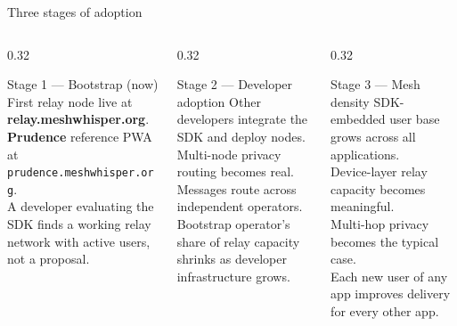 \documentclass[aspectratio=169, 11pt]{beamer}
\begin{document}
\begin{frame}{Three stages of adoption}
\vspace{3mm}
\begin{columns}[T]
  \begin{column}{0.32\textwidth}
    \begin{block}{Stage 1 — Bootstrap \textcolor{mwgreen}{(now)}}
      \small First relay node live at \textbf{relay.meshwhisper.org}.\\[4pt]
      \textbf{Prudence} reference PWA at \texttt{prudence.meshwhisper.org}.\\[4pt]
      A developer evaluating the SDK finds a working relay network with active users, not a proposal.
    \end{block}
  \end{column}
  \begin{column}{0.32\textwidth}
    \begin{block}{Stage 2 — Developer adoption}
      \small Other developers integrate the SDK and deploy nodes.\\[4pt]
      Multi-node privacy routing becomes real.\\
      Messages route across independent operators.\\[4pt]
      Bootstrap operator's share of relay capacity shrinks as developer infrastructure grows.
    \end{block}
  \end{column}
  \begin{column}{0.32\textwidth}
    \begin{block}{Stage 3 — Mesh density}
      \small SDK-embedded user base grows across all applications.\\[4pt]
      Device-layer relay capacity becomes meaningful.\\
      Multi-hop privacy becomes the typical case.\\[4pt]
      Each new user of any app improves delivery for every other app.
    \end{block}
  \end{column}
\end{columns}
\vspace{4mm}
\end{frame}
\end{document}
